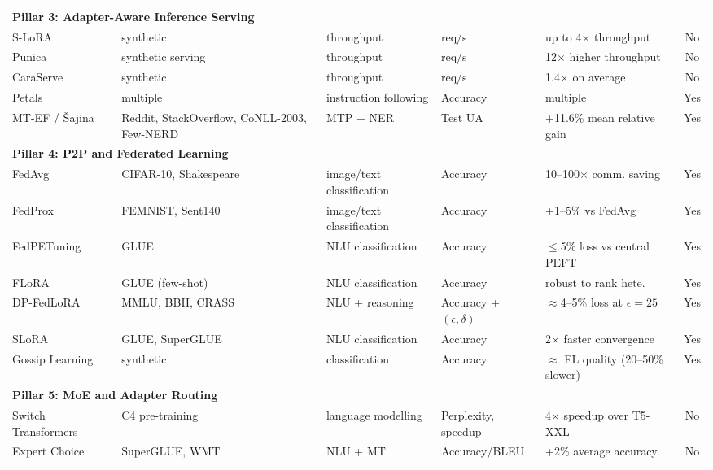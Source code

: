 \begin{table}
{\begin{tabular}{lllllc}
  \multicolumn{6}{l}{\textbf{Pillar 3: Adapter-Aware Inference Serving}} \\
  S-LoRA~\cite{Sheng2024} & synthetic & throughput & req/s & up to 4$\times$
  throughput & No \\
  Punica~\cite{Chen2023Punica} & synthetic serving & throughput & req/s &
  12$\times$ higher throughput & No \\
  CaraServe~\cite{Li2024CaraServe} & synthetic & throughput & req/s &
  1.4$\times$ on average & No \\
  Petals~\cite{Borzunov2023} & multiple & instruction following & Accuracy &
  multiple & Yes \\
  MT-EF / {\v{S}}ajina~\cite{Sajina2024} & Reddit, StackOverflow, CoNLL-2003,
  Few-NERD & MTP + NER & Test UA & +11.6\% mean relative gain & Yes \\
  \midrule
  \multicolumn{6}{l}{\textbf{Pillar 4: P2P and Federated Learning}} \\
  FedAvg~\cite{McMahan2017} & CIFAR-10, Shakespeare & image/text classification
   & Accuracy & 10--100$\times$ comm. saving & Yes \\
  FedProx~\cite{Li2020FedProx} & FEMNIST, Sent140 & image/text classification &
   Accuracy & +1--5\% vs FedAvg & Yes \\
  FedPETuning~\cite{ZhangFedPETuning2023} & GLUE & NLU classification &
  Accuracy & $\leq$5\% loss vs central PEFT & Yes \\
  FLoRA~\cite{WangFLoRA2024} & GLUE (few-shot) & NLU classification & Accuracy
  & robust to rank hete. & Yes \\
  DP-FedLoRA~\cite{XuDPFedLoRA2025} & MMLU, BBH, CRASS & NLU + reasoning &
  Accuracy + $(\epsilon,\delta)$ & $\approx$4--5\% loss at $\epsilon=25$ & Yes \\
  SLoRA~\cite{Babakniya2023} & GLUE, SuperGLUE & NLU classification & Accuracy
  & 2$\times$ faster convergence & Yes \\
  Gossip Learning~\cite{HegeduisGossip2019} & synthetic & classification &
  Accuracy & $\approx$ FL quality (20--50\% slower) & Yes \\
  \midrule
  \multicolumn{6}{l}{\textbf{Pillar 5: MoE and Adapter Routing}} \\
  Switch Transformers~\cite{Fedus2022} & C4 pre-training & language modelling &
   Perplexity, speedup & 4$\times$ speedup over T5-XXL & No \\
  Expert Choice~\cite{Zhou2022} & SuperGLUE, WMT & NLU + MT & Accuracy/BLEU &
  +2\% average accuracy & No \\

\end{tabular}}
\end{table}
